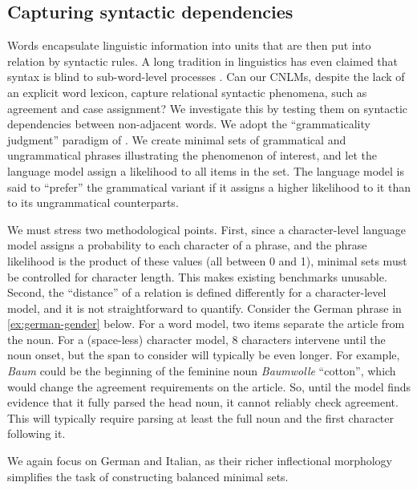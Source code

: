 \subsection{Capturing syntactic dependencies}
\label{sec:dependencies}

Words encapsulate linguistic information into units that are then put
into relation by syntactic rules. A long tradition in linguistics has
even claimed that syntax is blind to sub-word-level processes
\cite[e.g.,][]{Chomsky:1970,DiSciullo:Williams:1987,Bresnan:Mchombo:1995,Williams:2007}. Can
our CNLMs, despite the lack of an explicit word lexicon, capture
relational syntactic phenomena, such as agreement and case assignment?
We investigate this by testing them on syntactic dependencies between
non-adjacent words. We adopt the ``grammaticality judgment'' paradigm
of . We create minimal sets of grammatical
and ungrammatical phrases illustrating the phenomenon of interest, and
let the language model assign a likelihood to all items in the
set. The language model is said to ``prefer'' the grammatical variant
if it assigns a higher likelihood to it than to its ungrammatical
counterparts.

We must stress two methodological points. First, since a
character-level language model assigns a probability to each character
of a phrase, and the phrase likelihood is the product of these values
(all between 0 and 1), minimal sets must be controlled for character
length. This makes existing benchmarks unusable. Second, the
``distance'' of a relation is defined differently for a
character-level model, and it is not straightforward to
quantify. Consider the German phrase in \ref{ex:german-gender}
below. For a word model, two items separate the article from the
noun. For a (space-less) character model, 8 characters intervene until
the noun onset, but the span to consider will typically be even longer. For
example, \emph{Baum} could be the beginning of the feminine noun
\emph{Baumwolle} ``cotton'', which would change the agreement
requirements on the article. So, until the model finds evidence that
it fully parsed the head noun, it cannot reliably check
agreement. This will typically require parsing at least the full noun
and the first character following it.

We again focus on German and Italian, as their richer inflectional
morphology simplifies the task of constructing balanced minimal sets.



